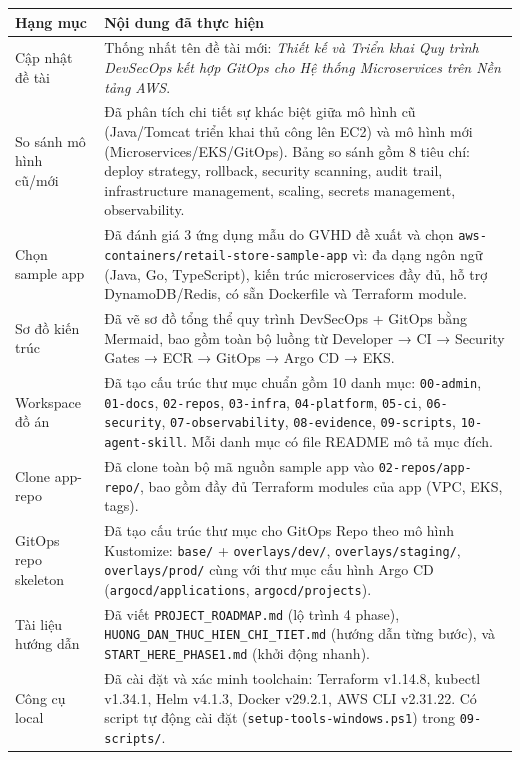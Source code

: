 \documentclass[12pt,a4paper]{article}
\begin{document}
\begin{longtable}{p{} p{}}
\toprule
\textbf{Hạng mục} & \textbf{Nội dung đã thực hiện} \\
\midrule
Cập nhật đề tài &
Thống nhất tên đề tài mới: \textit{Thiết kế và Triển khai Quy trình DevSecOps kết hợp GitOps cho Hệ thống Microservices trên Nền tảng AWS}. \\
\midrule
So sánh mô hình cũ/mới &
Đã phân tích chi tiết sự khác biệt giữa mô hình cũ (Java/Tomcat triển khai thủ công lên EC2) và mô hình mới (Microservices/EKS/GitOps). Bảng so sánh gồm 8 tiêu chí: deploy strategy, rollback, security scanning, audit trail, infrastructure management, scaling, secrets management, observability. \\
\midrule
Chọn sample app &
Đã đánh giá 3 ứng dụng mẫu do GVHD đề xuất và chọn \texttt{aws-containers/retail-store-sample-app} vì: đa dạng ngôn ngữ (Java, Go, TypeScript), kiến trúc microservices đầy đủ, hỗ trợ DynamoDB/Redis, có sẵn Dockerfile và Terraform module. \\
\midrule
Sơ đồ kiến trúc &
Đã vẽ sơ đồ tổng thể quy trình DevSecOps + GitOps bằng Mermaid, bao gồm toàn bộ luồng từ Developer → CI → Security Gates → ECR → GitOps → Argo CD → EKS. \\
\midrule
Workspace đồ án &
Đã tạo cấu trúc thư mục chuẩn gồm 10 danh mục: \texttt{00-admin}, \texttt{01-docs}, \texttt{02-repos}, \texttt{03-infra}, \texttt{04-platform}, \texttt{05-ci}, \texttt{06-security}, \texttt{07-observability}, \texttt{08-evidence}, \texttt{09-scripts}, \texttt{10-agent-skill}. Mỗi danh mục có file README mô tả mục đích. \\
\midrule
Clone app-repo &
Đã clone toàn bộ mã nguồn sample app vào \texttt{02-repos/app-repo/}, bao gồm đầy đủ Terraform modules của app (VPC, EKS, tags). \\
\midrule
GitOps repo skeleton &
Đã tạo cấu trúc thư mục cho GitOps Repo theo mô hình Kustomize: \texttt{base/} + \texttt{overlays/dev/}, \texttt{overlays/staging/}, \texttt{overlays/prod/} cùng với thư mục cấu hình Argo CD (\texttt{argocd/applications}, \texttt{argocd/projects}). \\
\midrule
Tài liệu hướng dẫn &
Đã viết \texttt{PROJECT\_ROADMAP.md} (lộ trình 4 phase), \texttt{HUONG\_DAN\_THUC\_HIEN\_CHI\_TIET.md} (hướng dẫn từng bước), và \texttt{START\_HERE\_PHASE1.md} (khởi động nhanh). \\
\midrule
Công cụ local &
Đã cài đặt và xác minh toolchain: Terraform v1.14.8, kubectl v1.34.1, Helm v4.1.3, Docker v29.2.1, AWS CLI v2.31.22. Có script tự động cài đặt (\texttt{setup-tools-windows.ps1}) trong \texttt{09-scripts/}. \\
\bottomrule
\end{longtable}
\end{document}
